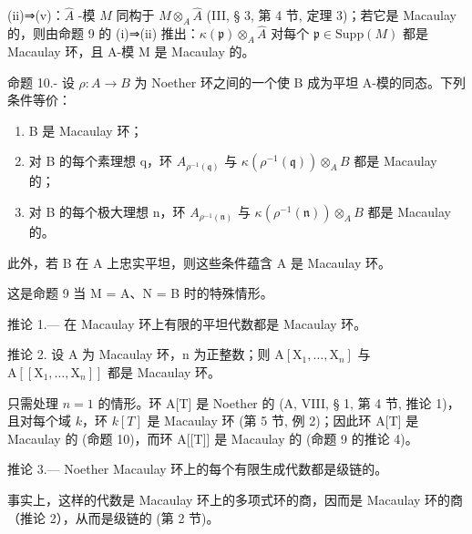 (ii)⇒(v)：\(\hat{A}\) -模 \(\hat{M}\) 同构于 \(M\otimes_{A}\hat{A}\) (III, § 3, 第 4 节, 定理 3)；若它是 Macaulay 的，则由命题 9 的 (i)⇒(ii) 推出：\(\kappa(\mathfrak{p})\otimes_{A}\hat{A}\) 对每个 \(\mathfrak{p}\in\mathrm{Supp}(M)\) 都是 Macaulay 环，且 A-模 M 是 Macaulay 的。

命题 10.- 设 \(\rho: A \to B\) 为 Noether 环之间的一个使 B 成为平坦 A-模的同态。下列条件等价：

\begin{enumerate}
\def\labelenumi{(\roman{enumi})}
\item
  B 是 Macaulay 环；
\item
  对 B 的每个素理想 q，环 \(A_{\rho^{-1}(\mathfrak{q})}\) 与 \(\kappa(\rho^{-1}(\mathfrak{q}))\otimes_{A}B\) 都是 Macaulay 的；
\item
  对 B 的每个极大理想 n，环 \(A_{\rho^{-1}(\mathfrak{n})}\) 与 \(\kappa(\rho^{-1}(\mathfrak{n})) \otimes_{A} B\) 都是 Macaulay 的。
\end{enumerate}

此外，若 B 在 A 上忠实平坦，则这些条件蕴含 A 是 Macaulay 环。

这是命题 9 当 M = A、N = B 时的特殊情形。

推论 1.--- 在 Macaulay 环上有限的平坦代数都是 Macaulay 环。

推论 2. 设 A 为 Macaulay 环，n 为正整数；则 \(\mathrm{A}[\mathrm{X}_1,\dots ,\mathrm{X}_n]\) 与 \(\mathrm{A}[[\mathrm{X}_1,\dots ,\mathrm{X}_n]]\) 都是 Macaulay 环。

只需处理 \(n = 1\) 的情形。环 A{[}T{]} 是 Noether 的 (A, VIII, § 1, 第 4 节, 推论 1)，且对每个域 \(k\)，环 \(k[T]\) 是 Macaulay 环 (第 5 节, 例 2)；因此环 A{[}T{]} 是 Macaulay 的 (命题 10)，而环 A{[}{[}T{]}{]} 是 Macaulay 的 (命题 9 的推论 4)。

推论 3.--- Noether Macaulay 环上的每个有限生成代数都是级链的。

事实上，这样的代数是 Macaulay 环上的多项式环的商，因而是 Macaulay 环的商（推论 2），从而是级链的 (第 2 节)。

